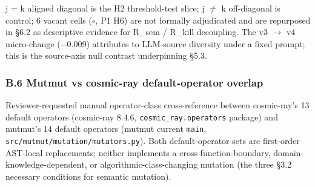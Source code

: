\documentclass[review,12pt,authoryear]{elsarticle}
\begin{document}
j = k aligned diagonal is the H2 threshold-test slice; j $\neq$ k
off-diagonal is control; 6 vacant cells ($\circ$, P1 H6) are not formally
adjudicated and are repurposed in §6.2 as descriptive evidence for
R\_sem / R\_kill decoupling. The v3 $\to$ v4 micro-change (−0.009)
attributes to LLM-source diversity under a fixed prompt; this is the
source-axis null contrast underpinning §5.3.

\subsubsection{B.6 Mutmut vs cosmic-ray default-operator overlap}\label{b.6-mutmut-vs-cosmic-ray-default-operator-overlap}

Reviewer-requested manual operator-class cross-reference between
cosmic-ray's 13 default operators (cosmic-ray 8.4.6,
\texttt{cosmic\_ray.operators} package) and mutmut's 14 default
operators (mutmut current \texttt{main},
\texttt{src/mutmut/mutation/mutators.py}). Both default-operator sets
are first-order AST-local replacements; neither implements a
cross-function-boundary, domain-knowledge-dependent, or
algorithmic-class-changing mutation (the three §3.2 necessary conditions
for semantic mutation).
\end{document}
